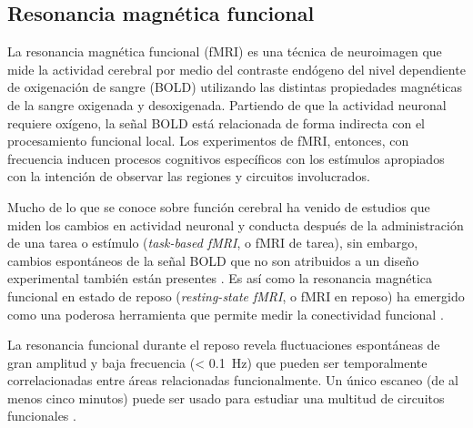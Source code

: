 \subsection{Resonancia magnética funcional}
La resonancia magnética funcional (fMRI) es una técnica de neuroimagen que mide la actividad cerebral por medio del contraste endógeno del nivel dependiente de oxigenación de sangre (BOLD) \parencite{Ogawa1993} utilizando las distintas propiedades magnéticas de la sangre oxigenada y desoxigenada.
Partiendo de que la actividad neuronal requiere oxígeno, la señal BOLD está relacionada de forma indirecta con el procesamiento funcional local.
Los experimentos de fMRI, entonces, con frecuencia inducen procesos cognitivos específicos con los estímulos apropiados con la intención de observar las regiones y circuitos involucrados. \par
Mucho de lo que se conoce sobre función cerebral ha venido de estudios que miden los cambios en actividad neuronal y conducta después de la administración de una tarea o estímulo (\textit{task-based fMRI}, o fMRI de tarea), sin embargo, cambios espontáneos de la señal BOLD que no son atribuidos a un diseño experimental también están presentes \parencite{Fox2007}.
Es así como la resonancia magnética funcional en estado de reposo (\textit{resting-state fMRI}, o fMRI en reposo) ha emergido como una poderosa herramienta que permite medir la conectividad funcional \parencite{Biswal2010}.\par
La resonancia funcional durante el reposo revela fluctuaciones espontáneas de gran amplitud y baja frecuencia (\deactivatequoting\SI{< 0.1}{\hertz}\activatequoting) que pueden ser temporalmente correlacionadas entre áreas relacionadas funcionalmente.
Un único escaneo (de al menos cinco minutos) puede ser usado para estudiar una multitud de circuitos funcionales \parencite{Biswal2010}.

